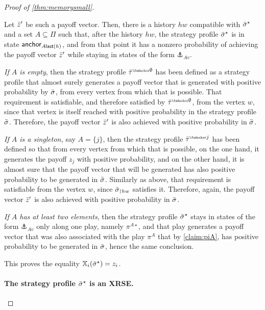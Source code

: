 \begin{proof}[Proof of \cref{thm:memorysmall}]
\begin{claimproof}
\begin{claimproof}
    Let $\bar{z}'$ be such a payoff vector.
    Then, there is a history $hw$ compatible with ${\bar{\sigma}}^\star$ and a set $A \subseteq \Pi$ such that, after the history $hw$, the strategy profile ${\bar{\sigma}}^\star$ is in state $\mathsf{anchor}_{A \mathsf{last}(h)}$, and from that point it has a nonzero probability of achieving the payoff vector $\bar{z}'$ while staying in states of the form $\anchor_{A v}$.
    
    \emph{If $A$ is empty}, then the strategy profile $\btau^{\anch \emptyset}$ has been defined as a strategy profile that almost surely generates a payoff vector that is generated with positive probability by ${\bar{\sigma}}$, from every vertex from which that is possible.
    That requirement is satisfiable, and therefore satisfied by $\btau^{\anch \emptyset}$, from the vertex $w$, since that vertex is itself reached with positive probability in the strategy profile ${\bar{\sigma}}$.
    Therefore, the payoff vector $\bar{z}'$ is also achieved with positive probability in ${\bar{\sigma}}$.
    
    \emph{If $A$ is a singleton,} say $A = \{j\}$, then the strategy profile $\btau^{\anch j}$ has been defined so that from every vertex from which that is possible, on the one hand, it generates the payoff $z_j$ with positive probability, and on the other hand, it is almost sure that the payoff vector that will be generated has also positive probability to be generated in ${\bar{\sigma}}$.
    Similarly as above, that requirement is satisfiable from the vertex $w$, since ${\bar{\sigma}}_{\upharpoonright hw}$ satisfies it.
    Therefore, again, the payoff vector $\bar{z}'$ is also achieved with positive probability in ${\bar{\sigma}}$.
    
    \emph{If $A$ has at least two elements}, then the strategy profile ${\bar{\sigma}}^\star$ stays in states of the form $\anchor_{A v}$ only along one play, namely $\pi^{A\star}$, and that play generates a payoff vector that was also associated with the play $\pi^A$ that by \cref{claim:piA}, has positive probability to be generated in ${\bar{\sigma}}$, hence the same conclusion.
\end{claimproof}

This proves the equality $\mathbb{X}_i({\bar{\sigma}}^\star) = z_i$.
\end{claimproof}


\paragraph*{The strategy profile ${\bar{\sigma}}^\star$ is an XRSE.}


\end{proof}
